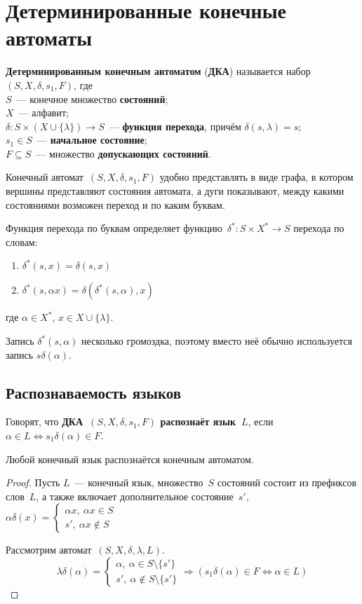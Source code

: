 \section{Детерминированные конечные автоматы}
  \textbf{Детерминированным конечным автоматом} (\textbf{ДКА}) называется набор~$(S, X, \delta, s_1, F)$, где\\
$S$~--- конечное множество \textbf{состояний};\\
$X$~--- алфавит;\\
$\delta \colon S \times (X \cup \{ \lambda \}) \to S$~--- \textbf{функция перехода}, причём $\delta(s, \lambda) = s$;\\
$s_1 \in S$~--- \textbf{начальное состояние};\\
$F \subseteq S$~--- множество \textbf{допускающих состояний}.

Конечный автомат~$(S, X, \delta, s_1, F)$ удобно представлять в виде графа, в котором вершины представляют состояния автомата, а дуги показывают, между какими состояниями возможен переход и по каким буквам.

Функция перехода по буквам определяет функцию~$\delta^* \colon S \times X^* \to S$ перехода по словам:
\begin{enumerate}
	\item $\delta^*(s, x) = \delta(s, x)$
	\item $\delta^*(s, \alpha x) = \delta(\delta^*(s, \alpha), x)$
\end{enumerate}
где $\alpha \in X^*$, $x \in X \cup \{ \lambda \}$.

Запись $\delta^*(s, \alpha)$ несколько громоздка, поэтому вместо неё обычно используется запись $s \delta(\alpha)$.

\subsection{Распознаваемость языков}
Говорят, что \textbf{ДКА~$(S, X, \delta, s_1, F)$ распознаёт язык~$L$}, если $\alpha \in L \Leftrightarrow s_1 \delta(\alpha) \in F$.

\begin{statement}
Любой конечный язык распознаётся конечным автоматом.
\end{statement}
\begin{proof}
Пусть $L$~--- конечный язык, множество~$S$ состояний состоит из префиксов слов~$L$, а также включает дополнительное состояние~$s'$, $\alpha \delta(x) =
\begin{cases}
\alpha x, \ \alpha x \in S \\
s', \ \alpha x \notin S
\end{cases}$

Рассмотрим автомат~$(S, X, \delta, \lambda, L)$.
\begin{equation*}
\lambda \delta(\alpha) =
\begin{cases}
\alpha, \ \alpha \in S \setminus \{ s' \} \\
s', \ \alpha \notin S \setminus \{ s' \}
\end{cases} \Rightarrow
(s_1 \delta(\alpha) \in F \Leftrightarrow \alpha \in L)
\end{equation*}
\end{proof}

